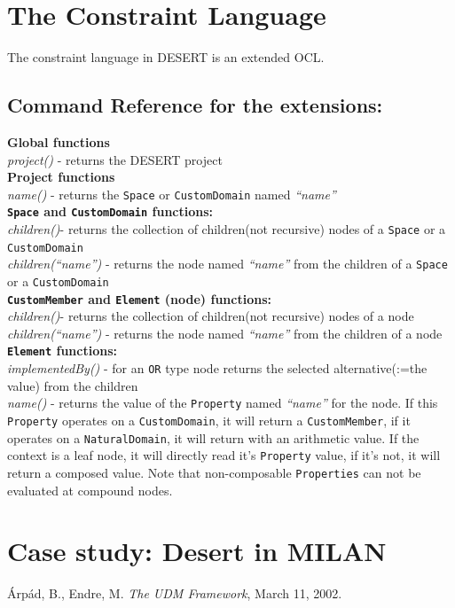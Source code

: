 \documentclass{article}
\begin{document}
\section{The Constraint Language}
\label{const_l}
The constraint language in DESERT is an extended OCL. 
\subsection{Command Reference for the extensions:}
{\bf Global functions}\\
{\it project()} - returns the DESERT project\\
{\bf Project functions}\\
{\it name()} - returns the {\tt Space} or {\tt CustomDomain} named {\it ``name''}\\
{\bf {\tt Space} and {\tt CustomDomain} functions:}\\
{\it children()}- returns the collection of children(not recursive) nodes of a {\tt Space} or a {\tt CustomDomain}\\
{\it children(``name'')} - returns the node named {\it ``name''} from the children of a {\tt Space} or a {\tt CustomDomain}\\
{\bf {\tt CustomMember} and {\tt Element} (node) functions:}\\
{\it children()}- returns the collection of children(not recursive) nodes of a node\\
{\it children(``name'')} - returns the node named {\it ``name''} from the children of a node\\
{\bf {\tt Element} functions:}\\
{\it implementedBy()} - for an {\tt OR} type node returns the selected alternative(:=the value) from the children\\
{\it name()} - returns the value of the {\tt Property} named {\it ``name''} for the node. If this {\tt Property} operates on a {\tt CustomDomain}, it will return a {\tt CustomMember}, if it operates on a {\tt NaturalDomain}, it will return with an arithmetic value. If the context is a leaf node, it will directly read it's {\tt Property} value, if it's not, it will return a composed value. Note that non-composable {\tt Properties} can not be evaluated at compound nodes.\\


\section{Case study: Desert in MILAN}
\begin{thebibliography}{99}
  \'Arp\'ad, B., Endre, M. {\it The UDM Framework}, March 11, 2002.
 \end{thebibliography}
\end{document}
